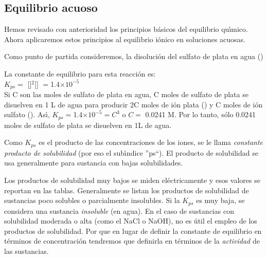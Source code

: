 \subsection{Equilibrio acuoso}
\label{eacuoso}

Hemos revisado con anterioridad los principios b\'asicos del equilibrio qu\'{\i}mico. Ahora aplicaremos estos principios al equilibrio i\'onico en soluciones acuosas.

Como punto de partida consideremos, la disoluci\'on del sulfato de plata en agua ()
 
La constante de equilibrio para esta reacci\'on es:\\[2pt]

\hskip 3cm $K_{ps} = $ []$^2$[] $=$1.4$\times10^{-5}$\\[2pt]

Si C son las moles de sulfato de plata en agua,  C moles de sulfato de plata se disuelven en 1 L de agua para producir 2C moles de i\'on plata () y C moles de i\'on sulfato (). As\'{\i}, $K_{ps}=$1.4$\times10^{-5} = C^3$ o $C=$ 0.0241 M. Por lo tanto, s\'olo 0.0241 moles de sulfato de plata se disuelven en 1L de agua.

Como $K_{ps}$ es el producto de las concentraciones de los iones, se le llama \emph{constante producto de solubilidad} (por eso el sub\'{\i}ndice ''ps``). El producto de solubilidad se usa generalmente para sustancia con bajas solubilidades. 

Los productos de solubilidad muy bajos se miden el\'ectricamente y esos valores se reportan en las tablas. Generalmente se listan los productos de solubilidad de sustancias poco solubles o parcialmente insolubles. Si la $K_{ps}$ es muy baja, se considera una sustancia \emph{insoluble} (en agua). En el caso de sustancias con solubilidad moderada o alta (como el NaCl o NaOH), no es \'util el empleo de los productos de solubilidad. Por que en lugar de definir  la constante de equilibrio en t\'erminos de concentraci\'on tendremos que definirla en t\'erminos de la \emph{actividad} de las sustancias.


